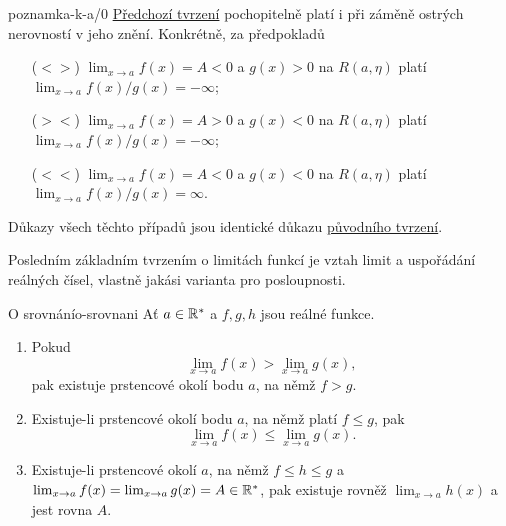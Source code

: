 \begin{remark}{}{poznamka-k-a/0}
 \hyperref[prop:limita-a/0]{Předchozí tvrzení} pochopitelně platí i při záměně
 ostrých nerovností v jeho znění. Konkrétně, za předpokladů
 \begin{itemize}
  \item[($< >$)] $\lim_{x \to a} f(x) = A < 0$ a $g(x) > 0$ na $R(a,\eta)$ platí $\lim_{x
   \to a} f(x) / g(x) = -\infty$;
  \item[($> <$)] $\lim_{x \to a} f(x) = A > 0$ a $g(x) < 0$ na $R(a,\eta)$ platí $\lim_{x
   \to a} f(x) / g(x) = -\infty$;
  \item[($< <$)] $\lim_{x \to a} f(x) = A < 0$ a $g(x) < 0$ na $R(a,\eta)$ platí $\lim_{x
   \to a} f(x) / g(x) = \infty$.
 \end{itemize}
 Důkazy všech těchto případů jsou identické důkazu
 \hyperref[prop:limita-a/0]{původního tvrzení}.
\end{remark}

Posledním základním tvrzením o limitách funkcí je vztah limit a uspořádání
reálných čísel, vlastně jakási varianta 
pro posloupnosti.

\begin{theorem}{O srovnání}{o-srovnani}
 Ať $a \in \mathbb{R}^{*}$ a $f,g,h$ jsou reálné funkce.
 \begin{enumerate}[label=(\alph*)]
  \item Pokud
   \[
    \lim_{x \to a} f(x) > \lim_{x \to a} g(x),
   \]
   pak existuje prstencové okolí bodu $a$, na němž $f > g$.
  \item Existuje-li prstencové okolí bodu $a$, na němž platí $f \leq g$, pak
   \[
    \lim_{x \to a} f(x) \leq \lim_{x \to a} g(x).
   \]
  \item Existuje-li prstencové okolí $a$, na němž $f \leq h \leq g$ a $\lim_{x
   \to a} f(x) = \lim_{x \to a} g(x) = A \in \mathbb{R}^{*}$, pak existuje rovněž
   $\lim_{x \to a} h(x)$ a jest rovna $A$.
 \end{enumerate}
\end{theorem}

